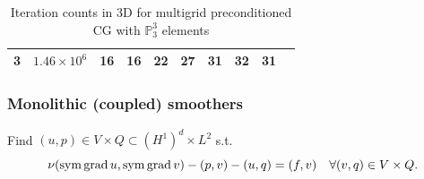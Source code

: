 \documentclass[presentation,aspectratio=43, 10pt]{beamer}
\DeclareMathOperator{\grad}{grad}
\let\div\relax
\DeclareMathOperator{\div}{div}
\DeclareMathOperator{\sym}{sym}
\begin{document}
\begin{frame}[t, fragile]
\begin{onlyenv}
\begin{overlayarea}{\textwidth}{0.275\textheight}
\begin{onlyenv}
\begin{table}
\begin{tabular}{cr|cccccccc}
            3      & $1.46\times 10^6$  & 16     & 16     & 22     & 27     & 31     & 32     & 31     \\
            \bottomrule
          \end{tabular}
          \caption{Iteration counts in 3D for multigrid preconditioned
            CG with $\mathbb{P}_3^3$ elements}
          \label{tab:sv-elasticity}
        \end{table}
      \end{onlyenv}
    \end{overlayarea}
  \end{onlyenv}
\end{frame}

\begin{frame}[fragile, t]
  \frametitle{Monolithic (coupled) smoothers}
  Find $(u, p) \in V\times Q \subset (H^1)^d \times L^2$ s.t.
  \begin{equation*}
    \nu (\sym \grad u, \sym \grad v) - (p, \div v) - (\div u, q) = (f, v) \quad \forall (v, q) \in V \times Q.
  \end{equation*}


\end{frame}
\end{document}
